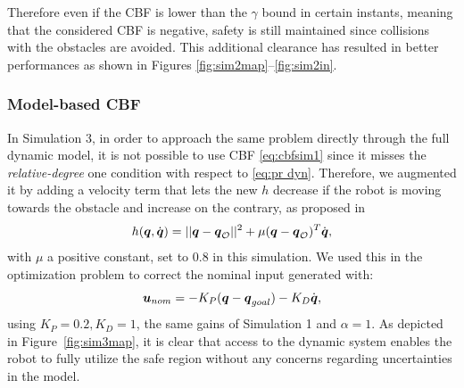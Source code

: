 Therefore even if the CBF is lower than the $\gamma$ bound in certain instants, meaning that the considered CBF is negative, safety is still maintained since collisions with the obstacles are avoided.
This additional clearance has resulted in better performances as shown in Figures \ref{fig:sim2map}--\ref{fig:sim2in}.
\subsubsection{Model-based CBF}
In Simulation 3, in order to approach the same problem directly through the full dynamic model, it is not possible to use CBF \eqref{eq:cbfsim1} since it misses the \textit{relative-degree} one condition with respect to \eqref{eq:pr dyn}. 
Therefore, we augmented it by adding a velocity term that lets the new $h$ decrease if the robot is moving towards the obstacle and increase on the contrary, as proposed in \cite{vendittelli}
\begin{equation}\label{eq:difmcbf}
    h({\boldsymbol{q}},\dot{\boldsymbol{q}})=||{\boldsymbol{q}}-{\boldsymbol{q}}_\mathcal{O}||^2+\mu({\boldsymbol{q}}-{\boldsymbol{q}}_\mathcal{O})^T\dot{\boldsymbol{q}},
\end{equation}
with $\mu$ a positive constant, set to $0.8$ in this simulation. We used this in the optimization problem to correct the nominal input generated with:
\begin{equation}
\boldsymbol{u}_{nom}=-K_P({\boldsymbol{q}} - {\boldsymbol{q}}_{goal})-K_D \dot{\boldsymbol{q}},
\end{equation}
using $K_P = 0.2, K_D = 1$, the same gains of Simulation 1 and $\alpha = 1$.
As depicted in Figure~\ref{fig:sim3map}, it is clear that access to the dynamic system enables the robot to fully utilize the safe region without any concerns regarding uncertainties in the model.
